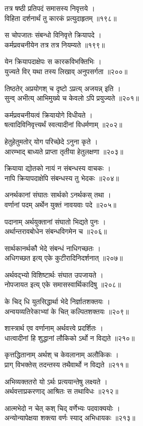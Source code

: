 तत्र षष्ठी प्रतिपदं समासस्य निवृत्तये ।\\विहिता दर्शनार्थं तु कारकं प्रत्युदाहृतम् ॥१९८॥

स चोपजातः संबन्धो विनिवृत्ते क्रियापदे ।\\कर्मप्रवचनीयेन तत्र तत्र नियम्यते ॥१९९॥

येन क्रियापदाक्षेपः स कारकविभक्तिभिः ।\\युज्यते विर् यथा तस्य लिखाव् अनुपसर्गता ॥२००॥

तिष्ठतेर् अप्रयोगश् च दृष्टो ऽप्रत्य् अजयन्न् इति ।\\सुन्व् अभीत्य् आभिमुख्ये च केवलो ऽपि प्रयुज्यते ॥२०१॥

कर्मप्रवचनीयत्वं क्रियायोगे विधीयते ।\\षत्वादिविनिवृत्त्यर्थं स्वत्यादीनां विधर्मणाम् ॥२०२॥

हेतुहेतुमतोर् योग परिच्छेदे ऽनुना कृते ।\\आरम्भाद् बाध्यते प्राप्ता तृतीया हेतुलक्षणा ॥२०३॥

क्रियाया द्योतको नायं न संबन्धस्य वाचकः ।\\नापि क्रियापदाक्षेपि संबन्धस्य तु भेदकः ॥२०४॥

अनर्थकानां संघातः सार्थको ऽनर्थकस् तथा ।\\वर्णानां पदम् अर्थेन युक्तं नावयवाः पदे ॥२०५॥

पदानाम् अर्थयुक्तानां संघातो भिद्यते पुनः ।\\अर्थान्तरावबोधेन संबन्धविगमेन च ॥२०६॥

सार्थकानर्थकौ भेदे संबन्धं नाधिगच्छतः ।\\अधिगच्छत इत्य् एके कुटीरादिनिदर्शनात् ॥२०७॥

अर्थवद्भ्यो विशिष्टार्थः संघात उपजायते ।\\नोपजायत इत्य् एके समासस्वार्थिकादिषु ॥२०८॥

के चिद् धि युतसिद्धार्था भेदे निर्ज्ञातशक्तयः ।\\अन्वयव्यतिरेकाभ्यां के चित् कल्पितशक्तयः ॥२०९॥

शास्त्रार्थ एव वर्णानाम् अर्थवत्त्वे प्रदर्शितः ।\\धात्वादीनां हि शुद्धानां लौकिको ऽर्थो न विद्यते ॥२१०॥

कृत्तद्धितानाम् अर्थश् च केवलानाम् अलौकिकः ।\\प्राग् विभक्तेस् तदन्तस्य तथैवार्थो न विद्यते ॥२११॥

अभिव्यक्ततरो यो ऽर्थः प्रत्ययान्तेषु लक्ष्यते ।\\अर्थवत्ताप्रकरणाद् आश्रितः स तथाविधः ॥२१२॥

आत्मभेदो न चेत् कश् चिद् वर्णेभ्यः पदवाक्ययोः ।\\अन्योन्यापेक्षया शक्त्या वर्णः स्याद् अभिधायकः ॥२१३॥

